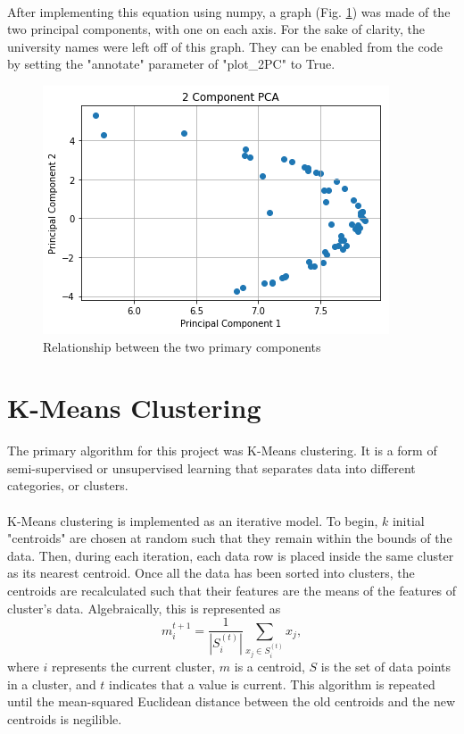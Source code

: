 \documentclass[12pt]{article}
\begin{document}
    \paragraph{} 
    After implementing this equation using numpy, a graph (Fig. \ref{PCA}) was made of the two principal components, with one on each axis. For the sake of clarity, the university names were left off of this graph. They can be enabled from the code by setting the "annotate" parameter of "plot\_2PC" to True.
    \begin{figure}
    	\includegraphics[width=\linewidth]{Pictures/pca.png}
    	\caption{Relationship between the two primary components}
    	\label{PCA}
    \end{figure}

    \section{K-Means Clustering}
    The primary algorithm for this project was K-Means clustering. It is a form of semi-supervised or unsupervised learning that separates data into different categories, or clusters.
    \paragraph{} 
    K-Means clustering is implemented as an iterative model. To begin, $k$ initial "centroids" are chosen at random such that they remain within the bounds of the data. Then, during each iteration, each data row is placed inside the same cluster as its nearest centroid. Once all the data has been sorted into clusters, the centroids are recalculated such that their features are the means of the features of cluster's data. Algebraically, this is represented as
    \begin{equation}
    	m_i^{t+1} = \frac{1}{|S_i^{(t)}|}\sum_{x_j \in S_i^{(t)}}x_j,
    \end{equation}
    where $i$ represents the current cluster, $m$ is a centroid, $S$ is the set of data points in a cluster, and $t$ indicates that a value is current. This algorithm is repeated until the mean-squared Euclidean distance between the old centroids and the new centroids is negilible.
\end{document}
